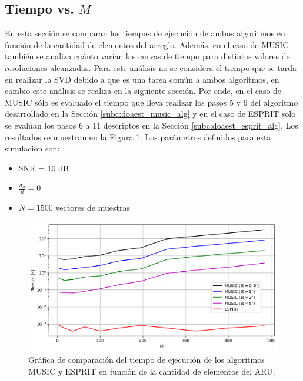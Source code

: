 \subsection{Tiempo vs. $M$}
En esta sección se comparan los tiempos de ejecución de ambos algoritmos en función de la cantidad de elementos del arreglo. Además, en el caso de MUSIC también se analiza cuánto varían las curvas de tiempo para distintos valores de resoluciones alcanzadas. Para este análisis no se considera el tiempo que se tarda en realizar la SVD debido a que es una tarea común a ambos algoritmos, en cambio este análisis se realiza en la siguiente sección. Por ende, en el caso de MUSIC sólo es evaluado el tiempo que lleva realizar los pasos 5 y 6 del algoritmo desarrollado en la Sección \ref{subc:doaest_music_alg} y en el caso de ESPRIT solo se evalúan los pasos 6 a 11 descriptos en la Sección \ref{subc:doaest_esprit_alg}. Los resultados se muestran en la Figura \ref{fig:tiempo_vs_m}. Los parámetros definidos para esta simulación son:
\begin{itemize}
    \item SNR = 10 dB
    \item $\frac{\sigma_d}{d}=0$
    \item $N=1500$ vectores de muestras
\end{itemize}
\begin{figure}[ht!]
    \centering
    \includegraphics[width=0.9\linewidth]{images/03-DOAEst/time_vs_m.png}
    \caption{Gráfica de comparación del tiempo de ejecución de los algoritmos MUSIC y ESPRIT en función de la cantidad de elementos del ARU.}
    \label{fig:tiempo_vs_m}
\end{figure}

